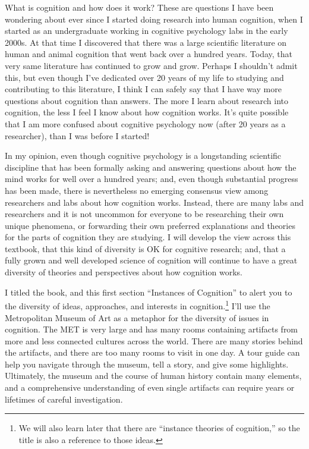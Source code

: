 \documentclass[
  oneside,
  12pt]{crumpbook}
\begin{document}
What is cognition and how does it work? These are questions I have been wondering about ever since I started doing research into human cognition, when I started as an undergraduate working in cognitive psychology labs in the early 2000s. At that time I discovered that there was a large scientific literature on human and animal cognition that went back over a hundred years. Today, that very same literature has continued to grow and grow. Perhaps I shouldn't admit this, but even though I've dedicated over 20 years of my life to studying and contributing to this literature, I think I can safely say that I have way more questions about cognition than answers. The more I learn about research into cognition, the less I feel I know about how cognition works. It's quite possible that I am more confused about cognitive psychology now (after 20 years as a researcher), than I was before I started!

In my opinion, even though cognitive psychology is a longstanding scientific discipline that has been formally asking and answering questions about how the mind works for well over a hundred years; and, even though substantial progress has been made, there is nevertheless no emerging consensus view among researchers and labs about how cognition works. Instead, there are many labs and researchers and it is not uncommon for everyone to be researching their own unique phenomena, or forwarding their own preferred explanations and theories for the parts of cognition they are studying. I will develop the view across this textbook, that this kind of diversity is OK for cognitive research; and, that a fully grown and well developed science of cognition will continue to have a great diversity of theories and perspectives about how cognition works.

I titled the book, and this first section ``Instances of Cognition'' to alert you to the diversity of ideas, approaches, and interests in cognition.\footnote{We will also learn later that there are ``instance theories of cognition,'' so the title is also a reference to those ideas.} I'll use the Metropolitan Museum of Art as a metaphor for the diversity of issues in cognition. The MET is very large and has many rooms containing artifacts from more and less connected cultures across the world. There are many stories behind the artifacts, and there are too many rooms to visit in one day. A tour guide can help you navigate through the museum, tell a story, and give some highlights. Ultimately, the museum and the course of human history contain many elements, and a comprehensive understanding of even single artifacts can require years or lifetimes of careful investigation.
\end{document}
